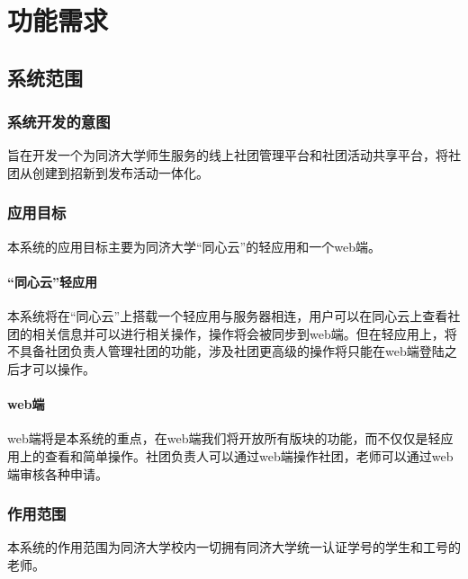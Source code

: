 \documentclass[UTF8]{ctexart}
\begin{document}
\section{功能需求}
\subsection{系统范围}
\subsubsection{系统开发的意图}
旨在开发一个为同济大学师生服务的线上社团管理平台和社团活动共享平台，将社团从创建到招新到发布活动一体化。
\subsubsection{应用目标}
本系统的应用目标主要为同济大学“同心云”的轻应用和一个web端。
\paragraph{“同心云”轻应用}
本系统将在“同心云”上搭载一个轻应用与服务器相连，用户可以在同心云上查看社团的相关信息并可以进行相关操作，操作将会被同步到web端。但在轻应用上，将不具备社团负责人管理社团的功能，涉及社团更高级的操作将只能在web端登陆之后才可以操作。
\paragraph{web端}
web端将是本系统的重点，在web端我们将开放所有版块的功能，而不仅仅是轻应用上的查看和简单操作。社团负责人可以通过web端操作社团，老师可以通过web端审核各种申请。

\subsubsection{作用范围}
本系统的作用范围为同济大学校内一切拥有同济大学统一认证学号的学生和工号的老师。
\end{document}
